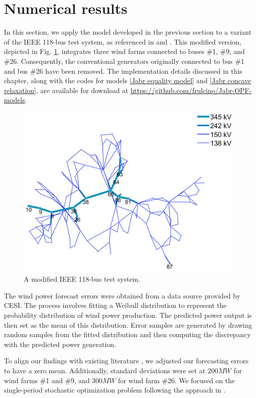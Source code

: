 \documentclass[11pt,a4paper,oneside,openany]{book}
\numberwithin{definition}{section}
\numberwithin{theorem}{section}
\numberwithin{problem}{section}
\begin{document}
\section{Numerical results} \label{Numerical results}
In this section, we apply the model developed in the previous section to a variant of the IEEE 118-bus test system, as referenced in \cite{DBDRSOPF2} and \cite{MATPOWER118bus}. This modified version, depicted in Fig. \ref{fig:118busFig}, integrates three wind farms connected to buses \#1, \#9, and \#26. Consequently, the conventional generators originally connected to bus \#1 and bus \#26 have been removed. The implementation details discussed in this chapter, along with the codes for models \eqref{Jabr equality model} and \eqref{Jabr concave relaxation}, are available for download at \url{https://github.com/frulcino/Jabr-OPF-models}.
\begin{figure}[htb]
        \centering
        \includegraphics[scale=0.6]{immagini/118graph.png}
        \caption{ A modified IEEE 118-bus test system.}
        \label{fig:118busFig}
\end{figure}


The wind power forecast errors were obtained from a data source provided by CESI. The process involves fitting a Weibull distribution to represent the probability distribution of wind power production. The predicted power output is then set as the mean of this distribution. Error samples are generated by drawing random samples from the fitted distribution and then computing the discrepancy with the predicted power generation.

To align our findings with existing literature \cite{DBDRSOPF2}, we adjusted our forecasting errors to have a zero mean. Additionally, standard deviations were set at $200MW$ for wind farms \#1 and \#9, and $300MW$ for wind farm \#26. We focused on the single-period stochastic optimization problem following the approach in \cite{DBDRSOPF2}.
\end{document}
